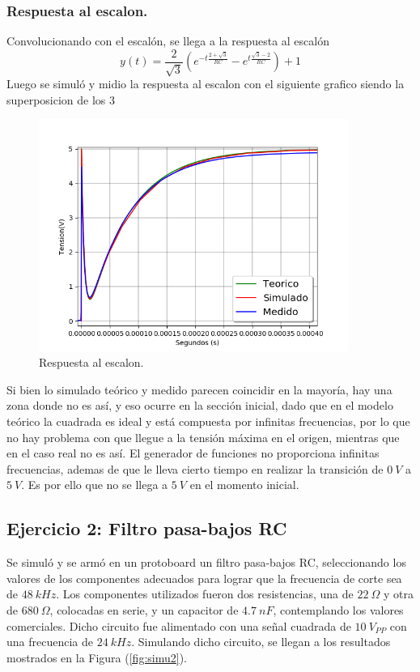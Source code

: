 \documentclass[a4paper]{article}
\begin{document}
\subsubsection{Respuesta al escalon.}
Convolucionando con el escalón, se llega a la respuesta al escalón
\begin{equation}
 y(t) = \frac{2}{\sqrt{3}} \left( e^{-t\frac{2 + \sqrt{3}}{RC}} - e^{t\frac{\sqrt{3} - 2}{RC}} \right) + 1
\label{equ:h*u}
\end{equation} 
Luego se simuló y midio la respuesta al escalon con el siguiente grafico siendo la superposicion de los 3
\begin{figure}[H]
	\centering
	\includegraphics[width=0.9\textwidth]{StepResponse.png}
\caption{Respuesta al escalon.}
	\label{fig:stepResponse}
\end{figure}
Si bien lo simulado teórico y medido parecen coincidir en la mayoría, hay una zona donde no es así, y eso ocurre en la sección inicial, dado que en el modelo teórico la cuadrada es ideal y está compuesta por infinitas frecuencias, por lo que no hay problema con que llegue a la tensión máxima en el origen, mientras que en el caso real no es así. El generador de funciones no proporciona infinitas frecuencias, ademas de que le lleva cierto tiempo en realizar la transición de $0 \ V$ a $5 \ V$. Es por ello que no se llega a $5 \ V$ en el momento inicial.

\subsection{Ejercicio 2: Filtro pasa-bajos RC}
Se simuló y se armó en un protoboard un filtro pasa-bajos RC, seleccionando los valores de los componentes adecuados para lograr que la frecuencia de corte sea de $ 48 \ kHz $. Los componentes utilizados fueron dos resistencias, una de $22 \ \Omega$ y otra de $680 \ \Omega$, colocadas en serie, y un capacitor de $4.7 \ nF$, contemplando los valores comerciales.
Dicho circuito fue alimentado con una señal cuadrada de $ 10 \ V_{PP} $ con una frecuencia de $ 24 \ kHz $.
Simulando dicho circuito, se llegan a los resultados mostrados en la Figura (\ref{fig:simu2}).
\end{document}
